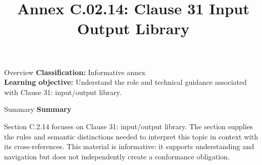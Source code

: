 \documentclass[10pt,letterpaper]{article}
\title{Annex C.02.14: Clause 31 Input Output Library}
\author{}
\date{}
\begin{document}
\maketitle
\begin{CornellOverviewBox}{Overview}
\textbf{Classification:} Informative annex\\[2pt]
\textbf{Learning objective:} Understand the role and technical guidance associated with Clause 31: input/output library.
\end{CornellOverviewBox}\begin{CornellSummaryBox}{Summary}
{\sffamily\bfseries\color{Accent} Summary}\par\vspace{3pt}Section C.2.14 focuses on Clause 31: input/output library. The section supplies the rules and semantic distinctions needed to interpret this topic in context with its cross-references. This material is informative: it supports understanding and navigation but does not independently create a conformance obligation.
\end{CornellSummaryBox}
\end{document}
